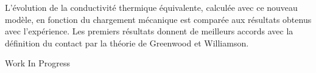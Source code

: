 {L'évolution de la conductivité thermique équivalente, calculée avec ce nouveau modèle, en fonction du chargement mécanique est comparée aux résultats obtenus avec l'expérience. Les premiers résultats donnent de meilleurs accords avec la définition du contact par la théorie de Greenwood et Williamson.



 \vfill Work In Progress

}
 
